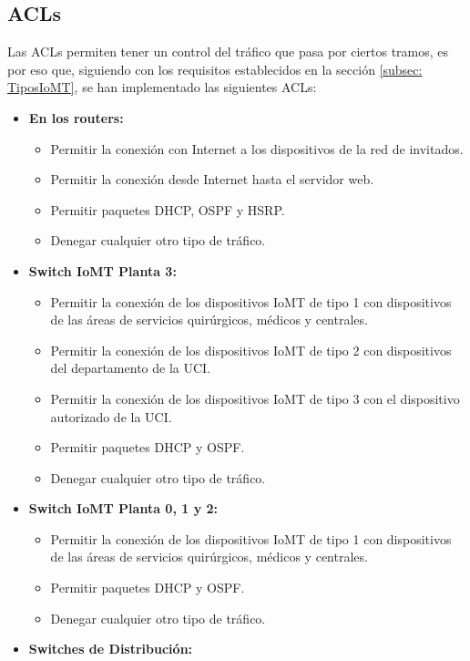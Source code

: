 \subsection{ACLs}\label{subsec:acls}
Las ACLs permiten tener un control del tráfico que pasa por ciertos tramos, es por eso que, siguiendo con los requisitos establecidos en la sección \ref{subsec: TiposIoMT}, se han implementado las siguientes ACLs:
\begin{itemize}
    \item \textbf{En los routers:} 
    \begin{itemize}
        \item Permitir la conexión con Internet a los dispositivos de la red de invitados.
        \item Permitir la conexión desde Internet hasta el servidor web.
        \item Permitir paquetes DHCP, OSPF y HSRP.
        \item Denegar cualquier otro tipo de tráfico.
    \end{itemize}
    \item \textbf{Switch IoMT Planta 3:}
    \begin{itemize}
        \item Permitir la conexión de los dispositivos IoMT de tipo 1 con dispositivos de las áreas de servicios quirúrgicos, médicos y centrales.
        \item Permitir la conexión de los dispositivos IoMT de tipo 2 con dispositivos del departamento de la UCI.
        \item Permitir la conexión de los dispositivos IoMT de tipo 3 con el dispositivo autorizado de la UCI.
        \item Permitir paquetes DHCP y OSPF.
        \item Denegar cualquier otro tipo de tráfico.
    \end{itemize}
    \item \textbf{Switch IoMT Planta 0, 1 y 2:}
    \begin{itemize}
        \item Permitir la conexión de los dispositivos IoMT de tipo 1 con dispositivos de las áreas de servicios quirúrgicos, médicos y centrales.
        \item Permitir paquetes DHCP y OSPF.
        \item Denegar cualquier otro tipo de tráfico.
    \end{itemize}
    \item \textbf{Switches de Distribución:}

\end{itemize}
